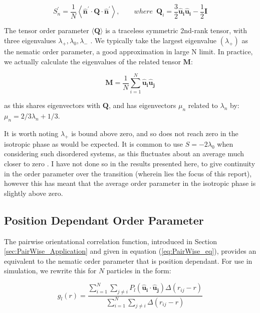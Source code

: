 \documentclass[11pt, a4paper]{article} %
\begin{document}
\begin{appendices}
\begin{equation}
S^{\prime}_{n} = \frac{1}{N} \left\langle \boldsymbol{\hat{n}^{\prime}} \cdot \textbf{Q} \cdot \boldsymbol{\hat{n}^{\prime}}  \right\rangle, \qquad where \enspace \textbf{Q}_{i} = \frac{3}{2} \boldsymbol{\hat{u}_{i}}\boldsymbol{\hat{u}_{i}}-\frac{1}{2}\textbf{I}
\end{equation}

The tensor order parameter $\langle \textbf{Q} \rangle$ is a traceless symmetric 2nd-rank tensor, with three eigenvalues $\lambda_{+}, \lambda_{0}, \lambda_{-}$ \cite{Eppenga1984}. We typically take the largest eigenvalue $(\lambda_{+})$ as the nematic order parameter, a good approximation in large N limit.
In practice, we actually calculate the eigenvalues of the related tensor $\textbf{M}$:

\begin{equation}
\textbf{M} =  \frac{1}{N} \sum_{i=1}^{N} \boldsymbol{\hat{u}_{i}}\boldsymbol{\hat{u}_{j}}
\end{equation}

as this shares eigenvectors with $\textbf{Q}$, and has eigenvectors $\mu_{n}$ related to $\lambda_{n}$ by: $\mu_{n} = 2/3 \lambda_{n} + 1/3$.

It is worth noting $\lambda_{+}$ is bound above zero, and so does not reach zero in the isotropic phase as would be expected. It is common to use $S =  -2\lambda_{0}$ when considering such disordered systems, as this fluctuates about an average much closer to zero \cite{Mountain1977}. I have not done so in the results presented here, to give continuity in the order parameter over the transition (wherein lies the focus of this report), however this has meant that the average order parameter in the isotropic phase is slightly above zero.

\subsection{Position Dependant Order Parameter} \label{sec:PairWise_Theory}
The pairwise orientational correlation function, introduced in Section \ref{sec:PairWise_Application} and given in equation (\ref{eq:PairWise_eq}), provides an equivalent to the nematic order parameter that is position dependant. For use in simulation, we rewrite this for $N$ particles in the form:

\begin{equation}
g_{l}(r) = \frac{\sum_{i=1}^{N} \sum_{j \neq i} P_{l}(\boldsymbol{\hat{u}_{i}}\cdot \boldsymbol{\hat{u}_{j}}) \Delta(r_{ij}-r)}{\sum_{i=1}^{N} \sum_{j \neq i} \Delta(r_{ij}-r)}
\end{equation}


\end{appendices}
\end{document}
